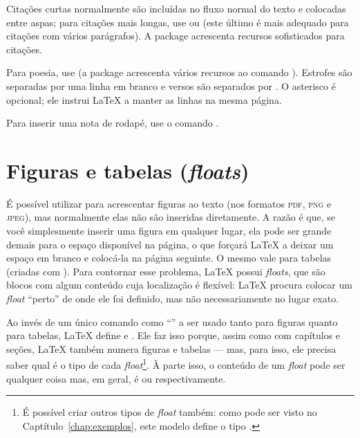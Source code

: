 Citações curtas normalmente são incluídas no fluxo normal do texto e colocadas
entre aspas; para citações mais longas, use  ou
 (este último é mais adequado para citações com
vários parágrafos). A package  acrescenta recursos sofisticados
para citações.

Para poesia, use  (a package  acrescenta
vários recursos ao comando ). Estrofes são separadas por uma linha
em branco e versos são separados por \cmd{\sla\sla{}*}. O asterisco é opcional;
ele instrui \LaTeX{} a manter as linhas na mesma página.

Para inserir uma nota de rodapé, use o comando .

\section{Figuras e tabelas (\emph{floats})}
\label{sec:floats}

\enlargethispage{.5\baselineskip}

É possível utilizar  para acrescentar figuras
ao texto (nos formatos \textsc{pdf}, \textsc{png} e \textsc{jpeg}),
mas normalmente elas não são inseridas diretamente. A razão é que, se
você simplesmente inserir uma figura em qualquer lugar, ela pode
ser grande demais para o espaço disponível na página, o que forçará
\LaTeX{} a deixar um espaço em branco e colocá-la na página seguinte.
O mesmo vale para tabelas (criadas com ).
Para contornar esse problema, \LaTeX{} possui \emph{floats}, que
são blocos com algum conteúdo cuja localização é flexível: \LaTeX{}
procura colocar um \emph{float} ``perto'' de onde ele foi definido,
mas não necessariamente no lugar exato.

Ao invés de um único comando como ``'' a
ser usado tanto para figuras quanto para tabelas, \LaTeX{} define
 e . Ele faz isso
porque, assim como com capítulos e seções, \LaTeX{} também numera
figuras e tabelas --- mas, para isso, ele precisa saber qual é o tipo de
cada \emph{float}\footnote{É possível criar outros tipos de \emph{float}
também: como pode ser visto no Captítulo~\ref{chap:exemplos}, este
modelo define o tipo .}. À parte isso, o conteúdo de
um \emph{float} pode ser qualquer coisa mas, em geral, é
 ou  respectivamente.

